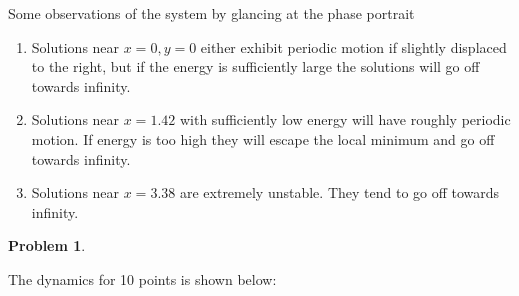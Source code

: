 \documentclass[12pt, a4paper]{article}
\newtheorem{problem}{Problem}
\theoremstyle{definition}
\begin{document}
Some observations of the system by glancing at the phase portrait
\begin{enumerate}
	\item Solutions near $x=0,y=0$ either exhibit periodic motion if slightly displaced to the right, but if the energy is sufficiently large the solutions will go off towards infinity. 
	\item Solutions near $x = 1.42$ with sufficiently low energy will have roughly periodic motion. If energy is too high they will escape the local minimum and go off towards infinity. 
	\item Solutions near $x = 3.38$ are extremely unstable. They tend to go off towards infinity. 
\end{enumerate}
\newpage
\begin{problem}
\end{problem}
The dynamics for 10 points is shown below:  
\end{document}
